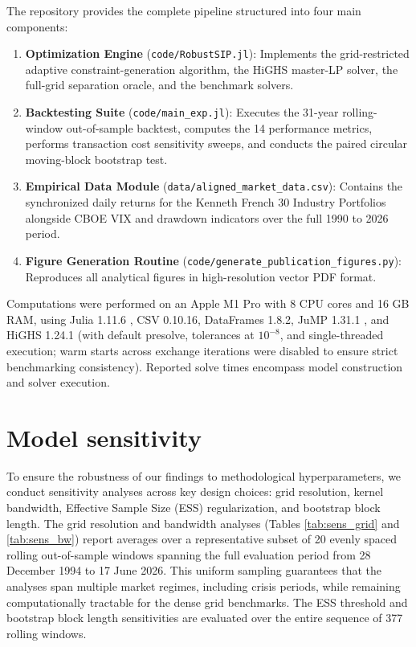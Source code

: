 \documentclass[smallextended]{svjour3}
\begin{document}
The repository provides the complete pipeline structured into four main components:
\begin{enumerate}
    \item \textbf{Optimization Engine} (\texttt{code/RobustSIP.jl}): Implements the grid-restricted adaptive constraint-generation algorithm, the HiGHS master-LP solver, the full-grid separation oracle, and the benchmark solvers.
    \item \textbf{Backtesting Suite} (\texttt{code/main\_exp.jl}): Executes the 31-year rolling-window out-of-sample backtest, computes the 14 performance metrics, performs transaction cost sensitivity sweeps, and conducts the paired circular moving-block bootstrap test.
    \item \textbf{Empirical Data Module} (\texttt{data/aligned\_market\_data.csv}): Contains the synchronized daily returns for the Kenneth French 30 Industry Portfolios \cite{french2026data} alongside CBOE VIX and drawdown indicators over the full 1990 to 2026 period.
    \item \textbf{Figure Generation Routine} (\texttt{code/}\allowbreak\texttt{generate\_publication\_figures.py}): Reproduces all analytical figures in high-resolution vector PDF format.
\end{enumerate}

Computations were performed on an Apple M1 Pro with 8 CPU cores and 16 GB RAM, using Julia 1.11.6 \cite{bezanson2017julia}, CSV 0.10.16, DataFrames 1.8.2, JuMP 1.31.1 \cite{dunning2017jump}, and HiGHS 1.24.1 \cite{huangfu2018parallelizing} (with default presolve, tolerances at $10^{-8}$, and single-threaded execution; warm starts across exchange iterations were disabled to ensure strict benchmarking consistency). Reported solve times encompass model construction and solver execution.

\section{Model sensitivity}\label{sec:sensitivity}
To ensure the robustness of our findings to methodological hyperparameters, we conduct sensitivity analyses across key design choices: grid resolution, kernel bandwidth, Effective Sample Size (ESS) regularization, and bootstrap block length. The grid resolution and bandwidth analyses (Tables \ref{tab:sens_grid} and \ref{tab:sens_bw}) report averages over a representative subset of 20 evenly spaced rolling out-of-sample windows spanning the full evaluation period from 28 December 1994 to 17 June 2026. This uniform sampling guarantees that the analyses span multiple market regimes, including crisis periods, while remaining computationally tractable for the dense grid benchmarks. The ESS threshold and bootstrap block length sensitivities are evaluated over the entire sequence of 377 rolling windows.
\end{document}
